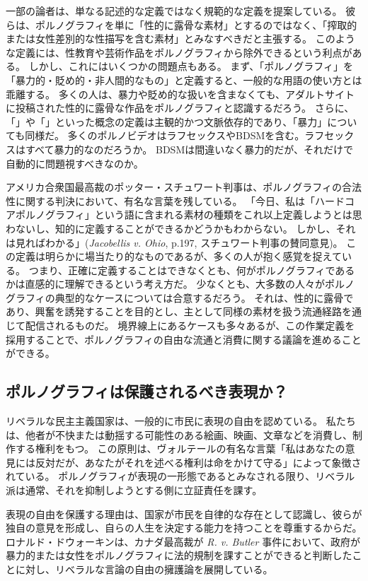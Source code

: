 \documentclass[paper=a4,book,openany]{jlreq}
\newcommand{\ig}[1]{}           %
\begin{document}
一部の論者は、単なる記述的な定義ではなく規範的な定義を提案している。
彼らは、ポルノグラフィを単に「性的に露骨な素材」とするのではなく、「搾取的または女性差別的な性描写を含む素材」とみなすべきだと主張する。
このような定義には、性教育や芸術作品をポルノグラフィから除外できるという利点がある。
しかし、これにはいくつかの問題点もある。
まず、「ポルノグラフィ」を「暴力的・貶め的・非人間的なもの」と定義すると、一般的な用語の使い方とは乖離する。
多くの人は、暴力や貶め的な扱いを含まなくても、アダルトサイトに投稿された性的に露骨な作品をポルノグラフィと認識するだろう。
さらに、「」や「」といった概念の定義は主観的かつ文脈依存的であり、「暴力」についても同様だ。
多くのポルノビデオはラフセックスやBDSMを含む。ラフセックスはすべて暴力的なのだろうか。
BDSMは間違いなく暴力的だが、それだけで自動的に問題視すべきなのか。

アメリカ合衆国最高裁のポッター・スチュワート判事は、ポルノグラフィの合法性に関する判決において、有名な言葉を残している。
「今日、私は「ハードコアポルノグラフィ」という語に含まれる素材の種類をこれ以上定義しようとは思わないし、知的に定義することができるかどうかもわからない。
しかし、それは見ればわかる」(\emph{Jacobellis v. Ohio}, p.197, スチュワート判事の賛同意見)。
この定義は明らかに場当たり的なものであるが、多くの人が抱く感覚を捉えている。
つまり、正確に定義することはできなくとも、何がポルノグラフィであるかは直感的に理解できるという考え方だ。
少なくとも、大多数の人々がポルノグラフィの典型的なケースについては合意するだろう。
それは、性的に露骨であり、興奮を誘発することを目的とし、主として同様の素材を扱う流通経路を通じて配信されるものだ。
境界線上にあるケースも多々あるが、この作業定義を採用することで、ポルノグラフィの自由な流通と消費に関する議論を進めることができる。

\subsection{ポルノグラフィは保護されるべき表現か？}

リベラルな民主主義国家は、一般的に市民に表現の自由を認めている。
私たちは、他者が不快または動揺する可能性のある絵画、映画、文章などを消費し、制作する権利をもつ。
この原則は、ヴォルテールの有名な言葉「私はあなたの意見には反対だが、あなたがそれを述べる権利は命をかけて守る」によって象徴されている。
ポルノグラフィが表現の一形態であるとみなされる限り、リベラル派は通常、それを抑制しようとする側に立証責任を課す。

表現の自由を保護する理由は、国家が市民を自律的な存在として認識し、彼らが独自の意見を形成し、自らの人生を決定する能力を持つことを尊重するからだ。
ロナルド・ドウォーキン\ig{Ronald Dworkin}は、カナダ最高裁が \emph{R. v. Butler} 事件において、政府が暴力的または女性をポルノグラフィに法的規制を課すことができると判断したことに対し、リベラルな言論の自由の擁護論を展開している。
\end{document}
